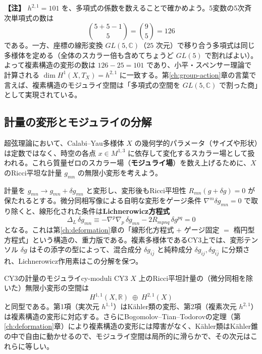 \documentclass[uplatex, dvipdfmx, book]{jsbook}
\let\origsubsection\subsection
\let\origsubsubsection\subsubsection
\renewcommand{\section}{\origsubsection}
\renewcommand{\subsection}{\origsubsubsection}
\renewcommand{\subsubsection}{\paragraph}
\newenvironment{note}{\vspace{1ex}\par\footnotesize\noindent\textbf{【注】}}{\par\vspace{1ex}}
\begin{document}
\begin{note}
$h^{2,1} = 101$ を、多項式の係数を数えることで確かめよう。5変数の5次斉次単項式の数は
\begin{equation*}
    \binom{5 + 5 - 1}{5} = \binom{9}{5} = 126
\end{equation*}
である。一方、座標の線形変換 $GL(5, \mathbb{C})$（$25$ 次元）で移り合う多項式は同じ多様体を定める（全体のスカラー倍も含めてちょうど $GL(5)$ で割ればよい）。よって複素構造の変形の数は $126 - 25 = 101$ であり、小平・スペンサー理論で計算される $\dim H^1(X, T_X) = h^{2,1}$ に一致する。第\ref{ch:group-action}章の言葉で言えば、複素構造のモジュライ空間は「多項式の空間を $GL(5, \mathbb{C})$ で割った商」として実現されている。
\end{note}

\section{計量の変形とモジュライの分解}

超弦理論において、Calabi--Yau多様体 $X$ の幾何学的パラメータ（サイズや形状）は定数ではなく、時空の各点 $x \in M^{1,3}$ に依存して変化するスカラー場として扱われる。これら質量ゼロのスカラー場（\textbf{モジュライ場}）を数え上げるために、$X$ のRicci平坦な計量 $g_{mn}$ の無限小変形を考えよう。

計量を $g_{mn} \to g_{mn} + \delta g_{mn}$ と変形し、変形後もRicci平坦性 $R_{mn}(g + \delta g) = 0$ が保たれるとする。微分同相写像による自明な変形をゲージ条件 $\nabla^m \delta g_{mn} = 0$ で取り除くと、線形化された条件は\textbf{Lichnerowicz方程式}
\begin{equation}
    \Delta_L\, \delta g_{mn} \equiv -\nabla^p\nabla_p\, \delta g_{mn} - 2R_{mpnq}\,\delta g^{pq} = 0
\end{equation}
となる。これは第\ref{ch:deformation}章の「線形化方程式 $+$ ゲージ固定 $=$ 楕円型方程式」という構造の、重力版である。複素多様体であるCY3上では、変形テンソル $\delta g$ はその添字の型によって、混合成分 $\delta g_{i\bar{j}}$ と純粋成分 $\delta g_{ij}, \delta g_{\bar{i}\bar{j}}$ に分類され、Lichnerowicz作用素はこの分解を保つ。

\begin{mythm}{CY3の計量のモジュライ}{cy-moduli}
CY3 $X$ 上のRicci平坦計量の（微分同相を除いた）無限小変形の空間は
\begin{equation*}
    H^{1,1}(X, \mathbb{R}) \;\oplus\; H^{2,1}(X)
\end{equation*}
と同型である。第1項（実次元 $h^{1,1}$）はK\"ahler類の変形、第2項（複素次元 $h^{2,1}$）は複素構造の変形に対応する。さらにBogomolov--Tian--Todorovの定理（第\ref{ch:deformation}章）により複素構造の変形には障害がなく、K\"ahler類はK\"ahler錐の中で自由に動かせるので、モジュライ空間は局所的に滑らかで、その次元はこれらに等しい。
\end{mythm}
\end{document}
